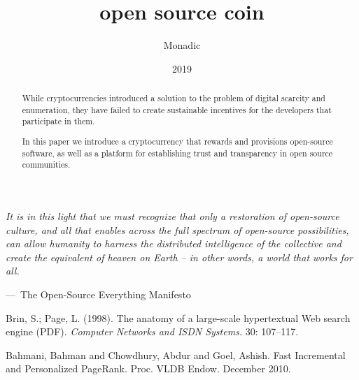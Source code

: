 \documentclass[a4paper, oneside, 9pt, draft]{amsart}
\makeatletter
\newenvironment{epigraph}[2][]
{\leftskip=1cm \def\epigraph@author{#2} \smallskip\itshape}
{\par\vspace{0.5em}\normalfont\hfill---\ \epigraph@author\hspace*{0.2cm}\par\medskip}
\makeatother
\begin{document}
\title[open source coin]{open source coin}
\author{Monadic}
\date{2019}

\maketitle

\begin{abstract}
While cryptocurrencies introduced a solution to the problem of digital scarcity
and enumeration, they have failed to create sustainable incentives for the
developers that participate in them.

In this paper we introduce a cryptocurrency that rewards and provisions
open-source software, as well as a platform for establishing trust and
transparency in open source communities.
\end{abstract}

\setlength{\columnsep}{20pt}
\begin{multicols}{2}

\begin{epigraph}{The Open-Source Everything Manifesto}
    \noindent It is in this light that we must recognize that only a restoration of
    open-source culture, and all that enables across the full spectrum of
    open-source possibilities, can allow humanity to harness the distributed
    intelligence of the collective and create the equivalent of heaven on Earth
    -- in other words, a world that works for all.
\end{epigraph}
\medskip






\end{multicols}

\begin{thebibliography}{9}

 Brin, S.; Page, L. (1998). The anatomy of a
  large-scale hypertextual Web search engine (PDF). \emph{Computer Networks
  and ISDN Systems.} 30: 107–117.

 Bahmani, Bahman and Chowdhury, Abdur and Goel,
  Ashish. Fast Incremental and Personalized PageRank. Proc. VLDB
  Endow. December 2010.

\end{thebibliography}
\end{document}
